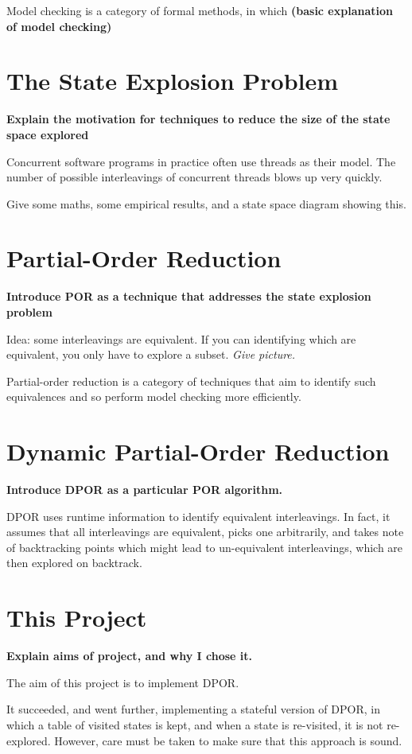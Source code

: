 \documentclass[12pt,a4paper,twoside,openright]{report}
\begin{document}
Model checking is a category of formal
methods, in which \textbf{(basic explanation of
model checking)}

\section{The State Explosion Problem}
\textbf{Explain the motivation for techniques
	to reduce the size of the state space explored}

Concurrent software programs in practice often
use threads as their model. The number of possible
interleavings of concurrent threads blows up very 
quickly.

Give some maths, some empirical results,
and a state space diagram showing this.

\section{Partial-Order Reduction}
\textbf{Introduce POR as a technique that
	addresses the state explosion problem}

Idea: some interleavings are equivalent. If you
can identifying which are equivalent, you only
have to explore a subset. \emph{Give picture.}

Partial-order reduction is a category of techniques
that aim to identify such equivalences and so
perform model checking more efficiently.

\section{Dynamic Partial-Order Reduction}
\textbf{Introduce DPOR as a particular
	POR algorithm.}

DPOR uses runtime information to identify
equivalent interleavings. In fact, it assumes
that all interleavings are equivalent, picks
one arbitrarily, and takes note of backtracking
points which might lead to un-equivalent
interleavings, which are then explored on
backtrack.

\section{This Project}
\textbf{Explain aims of project, and why I
	chose it.}

The aim of this project is to implement DPOR.

It succeeded, and went further, implementing
a stateful version of DPOR, in which a table
of visited states is kept, and when a state is
re-visited, it is not re-explored. However, care
must be taken to make sure that this approach is
sound.
\end{document}
